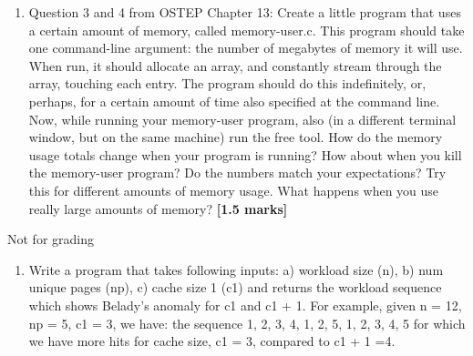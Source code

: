 \documentclass[]{article}
\begin{document}
\begin{enumerate}
	\item Question 3 and 4 from OSTEP Chapter 13: Create a little program that uses a certain amount of memory, called
	memory-user.c. This program should take one command-line argument:
	the number of megabytes of memory it will use. When run, it should allocate
	an array, and constantly stream through the array, touching each entry.
	The program should do this indefinitely, or, perhaps, for a certain amount
	of time also specified at the command line.
	Now, while running your memory-user program, also (in a different terminal
	window, but on the same machine) run the free tool. How do the
	memory usage totals change when your program is running? How about
	when you kill the memory-user program? Do the numbers match your expectations?
	Try this for different amounts of memory usage. What happens
	when you use really large amounts of memory?  \textbf{[1.5 marks]}
	
\end{enumerate}


Not for grading
\begin{enumerate}
\item Write a program that takes following inputs: a) workload size (n), b) num unique pages (np), c) cache size 1 (c1) and returns the workload sequence which shows Belady's anomaly for c1 and c1 + 1. For example, given n = 12, np = 5, c1 = 3, we have: the sequence 1, 2, 3, 4, 1, 2, 5, 1, 2, 3, 4, 5 for which we have more hits for cache size, c1 = 3, compared to c1 + 1 =4.
\end{enumerate}
\end{document}
